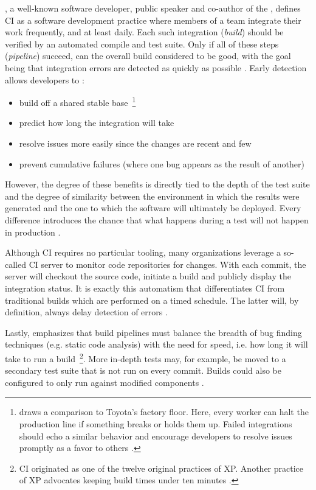 \begin{appendices}
\citeauthor{fowler2006continuous}, a well-known software developer, public speaker and co-author of the , defines \ac{CI} as a software development practice where members of a team integrate their work frequently, and at least daily. Each such integration (\textit{build}) should be verified by an automated compile and test suite. Only if all of these steps (\textit{pipeline}) succeed, can the overall build considered to be good, with the goal being that integration errors are detected as quickly as possible \cite[pp.~1,~3]{fowler2006continuous}. Early detection allows developers to \cite[pp.~7,~11--12]{fowler2006continuous}:

\begin{itemize}
  \item build off a shared stable base~\footnote{\citeauthor{meyer2014continuous} draws a comparison to Toyota's factory floor. Here, every worker can halt the production line if something breaks or holds them up. Failed integrations should echo a similar behavior and encourage developers to resolve issues promptly as a favor to others \cite[p.~15]{meyer2014continuous}.}
  \item predict how long the integration will take
  \item resolve issues more easily since the changes are recent and few
  \item prevent cumulative failures (where one bug appears as the result of another)
\end{itemize}

However, the degree of these benefits is directly tied to the depth of the test suite and the degree of similarity between the environment in which the results were generated and the one to which the software will ultimately be deployed. Every difference introduces the chance that what happens during a test will not happen in production \cite[pp.~9,~12]{fowler2006continuous}.

Although \ac{CI} requires no particular tooling, many organizations leverage a so-called \ac{CI} server to monitor code repositories for changes. With each commit, the server will checkout the source code, initiate a build and publicly display the integration status. It is exactly this automatism that differentiates \ac{CI} from traditional builds which are performed on a timed schedule. The latter will, by definition, always delay detection of errors \cite[pp.~7,~10]{fowler2006continuous}.

Lastly, \citeauthor{fowler2006continuous} emphasizes that build pipelines must balance the breadth of bug finding techniques (e.g. static code analysis) with the need for speed, i.e. how long it will take to run a build~\footnote{\ac{CI} originated as one of the twelve original practices of \ac*{XP}. Another practice of \acs*{XP} advocates keeping build times under ten minutes \cite[pp.~2,~8]{fowler2006continuous}.}. More in-depth tests may, for example, be moved to a secondary test suite that is not run on every commit. Builds could also be configured to only run against modified components \cite[pp.~5,~8]{fowler2006continuous}.



\end{appendices}
